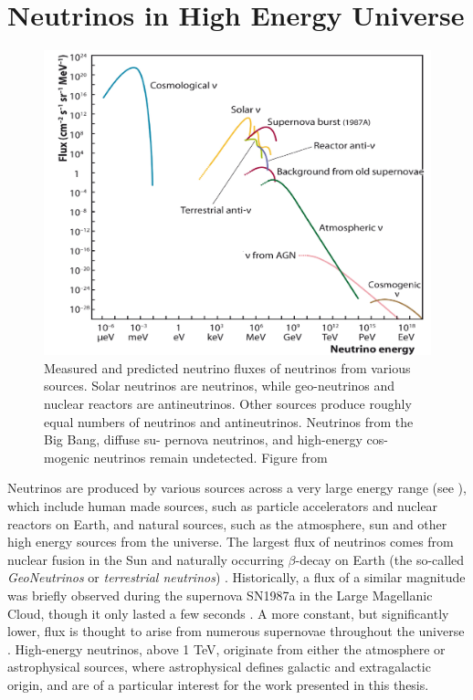 \setchapterpreamble[u]{\margintoc}
\chapter{Neutrinos in High Energy Universe}
\begin{figure}[h]
    \caption[Measured and predicted neutrino fluxes from natural sources]{Measured and predicted neutrino fluxes of neutrinos from various sources. Solar neutrinos are neutrinos, while geo-neutrinos and nuclear reactors are antineutrinos. Other sources produce roughly equal numbers of neutrinos and antineutrinos. Neutrinos from the Big Bang, diffuse su- pernova neutrinos, and high-energy cos- mogenic neutrinos remain undetected. Figure from \cite{KATZ2012651}}
    \includegraphics{./figures/nu_phenomenology/all-nu-spectrum-mod.png}
\end{figure}
Neutrinos are produced by various sources across a very large energy range (see ), which include human made sources, such as particle accelerators and nuclear reactors on Earth, and natural sources, such as the atmosphere, sun and other high energy sources from the universe. The largest flux of neutrinos comes from nuclear fusion in the Sun  and naturally occurring $\beta$-decay on Earth (the so-called \emph{GeoNeutrinos} or \emph{terrestrial neutrinos}) . Historically, a flux of a similar magnitude was briefly observed during the supernova SN1987a in the Large Magellanic Cloud, though it only lasted a few seconds . A more constant, but significantly lower, flux is thought to arise from numerous supernovae throughout the universe . High-energy neutrinos, above 1 TeV, originate from either the atmosphere or astrophysical sources, where astrophysical defines galactic and extragalactic origin, and are of a particular interest for the work presented in this thesis. 

